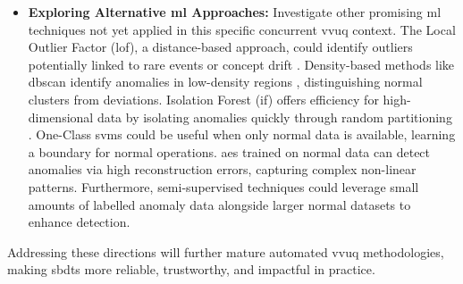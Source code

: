 \begin{itemize}
  \item \textbf{Exploring Alternative \gls{ml} Approaches:} Investigate other promising \gls{ml} techniques not yet applied in this specific concurrent \gls{vvuq} context. The Local Outlier Factor (\gls{lof}), a distance-based approach, could identify outliers potentially linked to rare events or concept drift \autocite{alghushairy2020review}. Density-based methods like \gls{dbscan} identify anomalies in low-density regions \autocite{ccelik2011anomaly}, distinguishing normal clusters from deviations. Isolation Forest (\gls{if}) offers efficiency for high-dimensional data by isolating anomalies quickly through random partitioning \autocite{xu2017improved}. One-Class \gls{svm}s \autocite{li2003improving} could be useful when only normal data is available, learning a boundary for normal operations. \gls{ae}s \autocite{zhou2017anomaly} trained on normal data can detect anomalies via high reconstruction errors, capturing complex non-linear patterns. Furthermore, semi-supervised techniques could leverage small amounts of labelled anomaly data alongside larger normal datasets to enhance detection.
\end{itemize}

Addressing these directions will further mature automated \gls{vvuq} methodologies, making \gls{sbdt}s more reliable, trustworthy, and impactful in practice. \blacksquare
